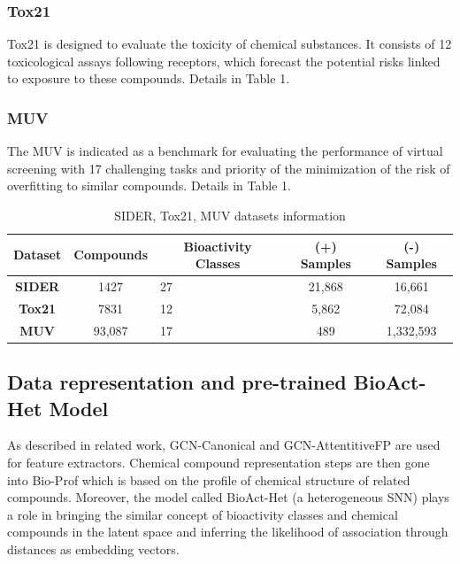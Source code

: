 \documentclass[conference]{IEEEtran}
\begin{document}
\subsubsection{Tox21}
Tox21 is designed to evaluate the toxicity of chemical substances. It consists of 12 toxicological assays following receptors, which forecast the potential risks linked to exposure to these compounds. Details in Table 1.\\

\subsubsection{MUV}
The MUV is indicated as a benchmark for evaluating the performance of virtual screening with 17 challenging tasks and priority of the minimization of the risk of overfitting to similar compounds. Details in Table 1.

\begin{table}[h!]
  \centering
  \caption{SIDER, Tox21, MUV datasets information}
  \label{tab: SIDER, Tox21, MUV Datasets}
  \begin{tabular}{|c|c|m{1.3cm}|c|c|}
    \hline
    \rowcolor{headercolor}
    \textbf{Dataset} & \textbf{Compounds} & \multicolumn{1}{|c|}{\textbf{Bioactivity Classes}} & \textbf{(+) Samples} & \textbf{(-) Samples} \\ \hline
    \textbf{SIDER}   & 1427               & 27                                                 & 21,868               & 16,661               \\ \hline
    \textbf{Tox21}   & 7831               & 12                                                 & 5,862                & 72,084               \\ \hline
    \textbf{MUV}     & 93,087             & 17                                                 & 489                  & 1,332,593            \\ \hline
  \end{tabular}
\end{table}

\subsection{Data representation and pre-trained BioAct-Het Model}
As described in related work, GCN-Canonical and GCN-AttentitiveFP are used for feature extractors. Chemical compound representation steps are then gone into Bio-Prof which is based on the profile of chemical structure of related compounds. Moreover, the model called BioAct-Het (a heterogeneous SNN) plays a role in bringing the similar concept of bioactivity classes and chemical compounds in the latent space and inferring the likelihood of association through distances as embedding vectors. \\
\end{document}
